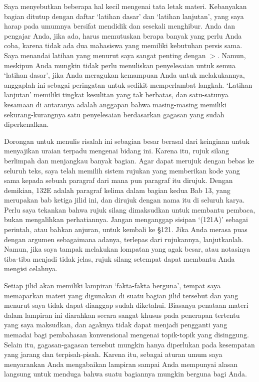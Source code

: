 Saya menyebutkan beberapa hal kecil mengenai tata letak materi.
Kebanyakan bagian ditutup dengan daftar `latihan dasar' dan
`latihan lanjutan', yang saya harap pada umumnya bersifat mendidik dan
sesekali menghibur.   Anda dan pengajar Anda, jika ada, harus memutuskan
berapa banyak yang perlu Anda coba, karena tidak ada dua mahasiswa yang
memiliki kebutuhan persis sama.   Saya menandai latihan yang menurut saya
sangat penting dengan $\pmb{>}$.   Namun, meskipun Anda mungkin tidak perlu
menuliskan penyelesaian untuk semua `latihan dasar', jika Anda meragukan
kemampuan Anda untuk melakukannya, anggaplah ini sebagai peringatan untuk
sedikit memperlambat langkah.   `Latihan lanjutan' memiliki tingkat kesulitan
yang tak berbatas,
dan satu-satunya kesamaan di antaranya adalah anggapan bahwa masing-masing
memiliki sekurang-kurangnya satu penyelesaian berdasarkan gagasan yang sudah
diperkenalkan.

Dorongan untuk menulis risalah ini sebagian besar berasal dari keinginan
untuk menyajikan uraian terpadu mengenai bidang ini.   Karena itu, rujuk silang
berlimpah dan menjangkau banyak bagian.   Agar dapat merujuk dengan bebas ke
seluruh
teks, saya telah memilih sistem rujukan yang memberikan kode yang sama kepada
sebuah paragraf dari mana pun paragraf itu dirujuk.   Dengan demikian, 132E adalah
paragraf kelima dalam bagian kedua Bab 13, yang merupakan
bab ketiga jilid ini, dan dirujuk dengan nama itu
di seluruh karya.
Perlu saya tekankan bahwa rujuk silang dimaksudkan untuk membantu pembaca,
bukan mengalihkan perhatiannya.   Jangan menganggap sisipan `(121A)' sebagai
perintah, atau bahkan anjuran, untuk kembali ke \S121.
Jika Anda merasa puas dengan argumen sebagaimana adanya,
terlepas dari rujukannya, lanjutkanlah.   Namun, jika saya tampak
melakukan lompatan yang agak besar, atau notasinya tiba-tiba menjadi
tidak jelas, rujuk silang setempat dapat membantu Anda mengisi celahnya.

Setiap jilid akan memiliki lampiran `fakta-fakta berguna', tempat saya
memaparkan materi yang digunakan di suatu bagian jilid tersebut dan yang
menurut saya tidak dapat dianggap sudah diketahui.   Biasanya penataan materi
dalam lampiran ini diarahkan secara sangat khusus pada penerapan tertentu
yang saya maksudkan, dan agaknya tidak dapat menjadi pengganti yang memadai
bagi pembahasan konvensional mengenai topik-topik yang disinggung.
Selain itu, gagasan-gagasan tersebut mungkin hanya diperlukan pada kesempatan
yang jarang dan terpisah-pisah.   Karena itu, sebagai aturan umum saya
menyarankan Anda mengabaikan lampiran sampai Anda mempunyai alasan langsung
untuk menduga bahwa suatu bagiannya mungkin berguna bagi Anda.

